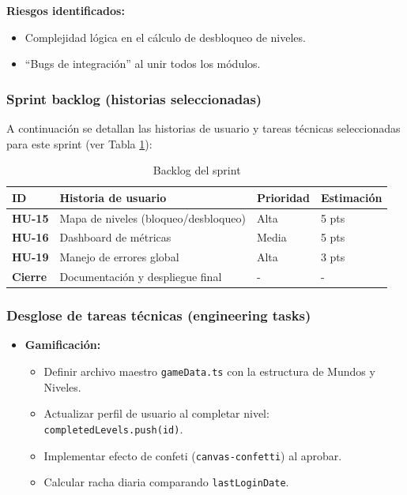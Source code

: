\textbf{Riesgos identificados:}
\begin{itemize}
\item Complejidad lógica en el cálculo de desbloqueo de niveles.
\item \enquote{Bugs de integración} al unir todos los módulos.
\end{itemize}

\subsubsection{Sprint backlog (historias seleccionadas)}

A continuación se detallan las historias de usuario y tareas técnicas seleccionadas para este sprint (ver Tabla \ref{tab:backlog_sprint4}):

\begin{table}[h]
\centering
\begin{tabularx}{0.95\textwidth}{|l|X|l|l|}
\hline
\textbf{ID} & \textbf{Historia de usuario} & \textbf{Prioridad} & \textbf{Estimación} \\
\hline
\textbf{HU-15} & Mapa de niveles (bloqueo/desbloqueo) & Alta & 5 pts \\
\hline
\textbf{HU-16} & Dashboard de métricas & Media & 5 pts \\
\hline
\textbf{HU-19} & Manejo de errores global & Alta & 3 pts \\
\hline
\textbf{Cierre} & Documentación y despliegue final & - & - \\
\hline
\end{tabularx}
\caption{Backlog del sprint}
\label{tab:backlog_sprint4}
\end{table}

\subsubsection{Desglose de tareas técnicas (engineering tasks)}

\begin{itemize}
\item \textbf{Gamificación:}
\begin{itemize}
\item [Backend] Definir archivo maestro \texttt{gameData.ts} con la estructura de Mundos y Niveles.
\item [Backend] Actualizar perfil de usuario al completar nivel: \texttt{completedLevels.push(id)}.
\item [Frontend] Implementar efecto de confeti (\texttt{canvas-confetti}) al aprobar.
\item [Backend] Calcular racha diaria comparando \texttt{lastLoginDate}.
\end{itemize}
\end{itemize}

